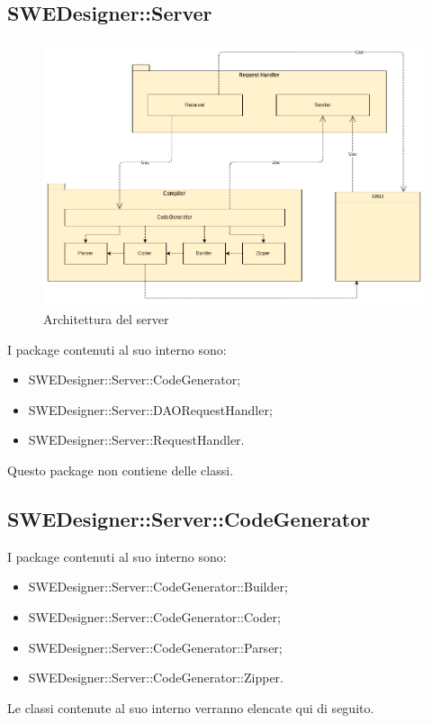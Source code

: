 \documentclass[../PianoDiQualifica.tex]{subfiles}
\begin{document}
		\subsection{SWEDesigner::Server}
			\begin{figure}[H]\label{fig:ServerSubsystem}
				\centering
				\includegraphics[scale=0.4]{Immagini/DiagrammaArchitettura/ServerSubsystem.png}
				\caption{Architettura del server}
			\end{figure}
		I package contenuti al suo interno sono:
		\begin{itemize}
			\item SWEDesigner::Server::CodeGenerator;
			\item SWEDesigner::Server::DAORequestHandler;
			\item SWEDesigner::Server::RequestHandler.
		\end{itemize}
		Questo package non contiene delle classi.
		\subsection{SWEDesigner::Server::CodeGenerator}
		I package contenuti al suo interno sono:
		\begin{itemize}
			\item SWEDesigner::Server::CodeGenerator::Builder;
			\item SWEDesigner::Server::CodeGenerator::Coder;
			\item SWEDesigner::Server::CodeGenerator::Parser;
			\item SWEDesigner::Server::CodeGenerator::Zipper.
		\end{itemize}
		Le classi contenute al suo interno verranno elencate qui di seguito.
\end{document}
